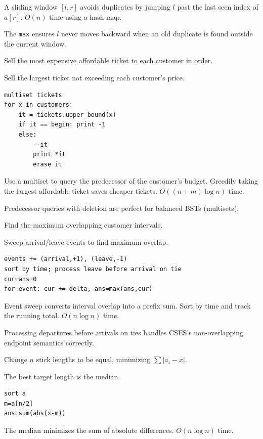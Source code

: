\Solution A sliding window $[l,r]$ avoids duplicates by jumping $l$ past the last seen index of $a[r]$. $O(n)$ time using a hash map.

\Analysis The \texttt{max} ensures $l$ never moves backward when an old duplicate is found outside the current window.


\Problem Sell the most expensive affordable ticket to each customer in order.

Sell the largest ticket not exceeding each customer's price.
\begin{lstlisting}
multiset tickets
for x in customers:
    it = tickets.upper_bound(x)
    if it == begin: print -1
    else:
        --it
        print *it
        erase it
\end{lstlisting}

\Solution Use a multiset to query the predecessor of the customer's budget. Greedily taking the largest affordable ticket saves cheaper tickets. $O((n+m) \log n)$ time.

\Analysis Predecessor queries with deletion are perfect for balanced BSTs (multisets).


\Problem Find the maximum overlapping customer intervals.

Sweep arrival/leave events to find maximum overlap.
\begin{lstlisting}
events += (arrival,+1), (leave,-1)
sort by time; process leave before arrival on tie
cur=ans=0
for event: cur += delta, ans=max(ans,cur)
\end{lstlisting}

\Solution Event sweep converts interval overlap into a prefix sum. Sort by time and track the running total. $O(n \log n)$ time.

\Analysis Processing departures before arrivals on ties handles CSES's non-overlapping endpoint semantics correctly.


\Problem Change $n$ stick lengths to be equal, minimizing $\sum |a_i - x|$.

The best target length is the median.
\begin{lstlisting}
sort a
m=a[n/2]
ans=sum(abs(x-m))
\end{lstlisting}

\Solution The median minimizes the sum of absolute differences. $O(n \log n)$ time.

